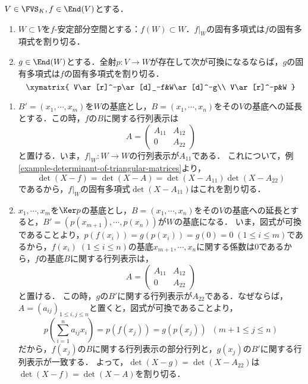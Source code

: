 \documentclass[uplatex, dvipdfmx]{jsreport}
\begin{document}
\begin{proposition}[固有多項式の遺伝]\label{prop-eigenpolynomial-as-patching}
    $V\in\FVS_K,f\in\End(V)$とする．
    \begin{enumerate}
        \item $W\subset V$を$f$-安定部分空間とする：$f(W)\subset W$．$f|_W$の固有多項式は$f$の固有多項式を割り切る．
        \item $g\in\End(W)$とする．全射$p:V\to W$が存在して次が可換になるならば，$g$の固有多項式は$f$の固有多項式を割り切る．
        \[\xymatrix{
            V\ar[r]^-p\ar[d]_-f&W\ar[d]^-g\\
            V\ar[r]^-p&W
        }\]
    \end{enumerate}
\end{proposition}
\begin{Proof}\mbox{}
    \begin{enumerate}
        \item $B'=(x_1,\cdots,x_m)$を$W$の基底とし，$B=(x_1,\cdots,x_n)$をその$V$の基底への延長とする．この時，$f$の$B$に関する行列表示は\[A=\begin{pmatrix}A_{11}&A_{12}\\0&A_{22}\end{pmatrix}\]と置ける．いま，$f|_W:W\to W$の行列表示が$A_{11}$である．
        これについて，例\ref{example-determinant-of-triangular-matrices}より，
        \[\det(X-f)=\det(X-A)=\det(X-A_{11})\det(X-A_{22})\]
        であるから，$f|_W$の固有多項式$\det(X-A_{11})$はこれを割り切る．
        \item $x_1,\cdots,x_m$を$\Ker p$の基底とし，$B=(x_1,\cdots,x_n)$をその$V$の基底への延長とすると，$B'=(p(x_{m+1}),\cdots,p(x_n))$が$W$の基底になる．
        いま，図式が可換であることより，$p(f(x_i))=g(p(x_i))=g(0)=0\;(1\le i\le m)$であるから，$f(x_i)\;(1\le i\le n)$の基底$x_{m+1},\cdots,x_n$に関する係数は$0$であるから，$f$の基底$B$に関する行列表示は，
        \[A=\begin{pmatrix}A_{11}&A_{12}\\0&A_{22}\end{pmatrix}\]と置ける．
        この時，$g$の$B'$に関する行列表示が$A_{22}$である．なぜならば，$A=(a_{ij})_{1\le i,j\le n}$と置くと，図式が可換であることより，
        \[p(\sum^n_{i=1}a_{ij}x_i)=p(f(x_j))=g(p(x_j))\;\;(m+1\le j\le n)\]
        だから，$f(x_j)$の$B$に関する行列表示の部分行列と，$g(x_j)$の$B'$に関する行列表示が一致する．
        よって，$\det(X-g)=\det(X-A_{22})$は$\det(X-f)=\det(X-A)$を割り切る．
    \end{enumerate}
\end{Proof}
\end{document}

